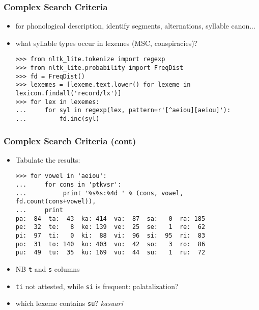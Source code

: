 \documentclass{beamer}             %
\begin{document}
\begin{frame}[fragile]
\frametitle{Complex Search Criteria}
\begin{itemize}
\item for phonological description, identify segments, alternations,
  syllable canon...
\item what syllable types occur in lexemes (MSC, conspiracies)?
\scriptsize

\begin{verbatim}
>>> from nltk_lite.tokenize import regexp
>>> from nltk_lite.probability import FreqDist
>>> fd = FreqDist()
>>> lexemes = [lexeme.text.lower() for lexeme in lexicon.findall('record/lx')]
>>> for lex in lexemes:
...     for syl in regexp(lex, pattern=r'[^aeiou][aeiou]'):
...         fd.inc(syl)
\end{verbatim}
\end{itemize}
\end{frame}

\begin{frame}[fragile]
\frametitle{Complex Search Criteria (cont)}

\begin{itemize}
\item Tabulate the results:

{\scriptsize
\begin{verbatim}
>>> for vowel in 'aeiou':
...     for cons in 'ptkvsr':
...          print '%s%s:%4d ' % (cons, vowel, fd.count(cons+vowel)),
...     print
pa:  84  ta:  43  ka: 414  va:  87  sa:   0  ra: 185 
pe:  32  te:   8  ke: 139  ve:  25  se:   1  re:  62 
pi:  97  ti:   0  ki:  88  vi:  96  si:  95  ri:  83 
po:  31  to: 140  ko: 403  vo:  42  so:   3  ro:  86 
pu:  49  tu:  35  ku: 169  vu:  44  su:   1  ru:  72 
\end{verbatim}}
\item NB \texttt{t} and \texttt{s} columns
\item \texttt{ti} not attested, while \texttt{si} is frequent: palatalization?
\item which lexeme contains \texttt{su}?  \textit{kasuari}
\end{itemize}
\end{frame}
\end{document}
